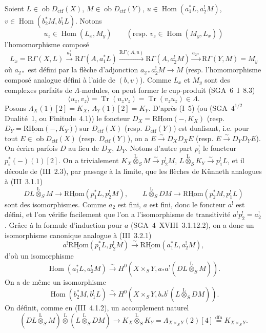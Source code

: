 \documentclass[11pt]{article}
\DeclareMathOperator{\Hom}{Hom}
\newcommand{\R}{\mathrm{R}}\newcommand{\RHomCore}{\mathrm{RHom}}
\newcommand{\ob}{\operatorname{ob}}
\providecommand{\RHom}{\RHomCore}
\providecommand{\uRHom}{\underline{\RHom}}
\providecommand{\ctf}{\mathrm{ctf}}
\providecommand{\Tr}{\operatorname{Tr}}
\providecommand{\Tr}{\operatorname{Tr}}
\providecommand{\lten}{\overset{\mathrm L}{\otimes}}
\providecommand{\Tr}{\operatorname{Tr}}
\providecommand{\RHom}{\RHomCore}
\providecommand{\Hom}{\operatorname{Hom}}
\providecommand{\ob}{\operatorname{ob}}
\providecommand{\lten}{\overset{\mathrm L}{\otimes}}
\providecommand{\RHom}{\R\mathcal{H}om}
\providecommand{\lten}{\overset{\mathrm L}{\otimes}}
\providecommand{\R}{\mathrm R}
\providecommand{\Tr}{\operatorname{Tr}}
\providecommand{\lten}{\overset{\mathrm L}{\otimes}}
\providecommand{\lten}{\overset{\mathrm L}{\otimes}}
\providecommand{\lten}{\overset{\mathrm L}{\otimes}}
\providecommand{\RHom}{\RHomCore}
\providecommand{\Hom}{\operatorname{Hom}}
\providecommand{\Tr}{\operatorname{Tr}}
\providecommand{\lten}{\overset{\mathrm L}{\otimes}}
\begin{document}
Soient $L\in \ob D_{\ctf}(X)$, $M\in \ob D_{\ctf}(Y)$, $u\in\Hom(a_1^*L,a_2^!M)$, $v\in\Hom(b_2^*M,b_1^!L)$. Notons
\[
u_z\in\Hom(L_x,M_y)\qquad (\text{resp. }v_z\in\Hom(M_y,L_x))
\]
l'homomorphisme composé
\[
L_x=\R\Gamma(X,L)\xrightarrow{a_1^*}\R\Gamma(A,a_1^*L)
\xrightarrow{\R\Gamma(A,u)}\R\Gamma(A,a_2^!M)
\xrightarrow{a_{2*}}\R\Gamma(Y,M)=M_y
\]
où $a_{2*}$ est défini par la flèche d'adjonction $a_{2*}a_2^!M\to M$ (resp. l'homomorphisme composé analogue défini à l'aide de $(b,v)$). Comme $L_x$ et $M_y$ sont des complexes parfaits de $\Lambda$-modules, on peut former le cup-produit (SGA~6~I~8.3)
\begin{equation}\tag{1.1.1}
\langle u_z,v_z\rangle=\Tr(u_zv_z)=\Tr(v_zu_z)\in\Lambda.
\end{equation}
Posons $\Lambda_X(1)[2]=K_X$, $\Lambda_Y(1)[2]=K_Y$. D'après (I~5) (ou (SGA~$4^{1/2}$ Dualité~1, ou Finitude~4.1)) le foncteur $D_X=\uRHom(-,K_X)$ (resp. $D_Y=\uRHom(-,K_Y)$) sur 
$D_{\ctf}(X)$ (resp. $D_{\ctf}(Y)$) est dualisant, i.e. pour tout $E\in\ob D_{\ctf}(X)$ (resp. $D_{\ctf}(Y)$), on a $E\xrightarrow{\sim}D_XD_XE$ (resp. $E\xrightarrow{\sim}D_YD_YE$). On écrira parfois $D$ au
lieu de $D_X$, $D_Y$. Notons d'autre part $p_i^!$ le foncteur $p_i^*(-)(1)[2]$. On a trivialement $K_X\lten_SM\xrightarrow{\sim}p_2^!M$, $L\lten_SK_Y\xrightarrow{\sim}p_1^!L$, et il découle de (III~2.3), par passage à la limite, que les flèches de Künneth analogues à (III~3.1.1)
\[
DL\lten_SM\longrightarrow \uRHom(p_1^*L,p_2^!M),
\qquad
L\lten_SDM\longrightarrow \uRHom(p_2^*M,p_1^!L)
\]
sont des isomorphismes. Comme $a_2$ est fini, $a$ est fini, donc le foncteur $a^!$ est défini, et l'on vérifie facilement que l'on a l'isomorphisme de transitivité $a^!p_2^!=a_2^!$. Grâce à la formule d'induction pour $a$ (SGA~4~XVIII~3.1.12.2), on a donc un isomorphisme canonique analogue à (III~3.2.1)
\[
a^!\uRHom(p_1^*L,p_2^!M)\xrightarrow{\sim}\uRHom(a_1^*L,a_2^!M),
\]
d'où un isomorphisme
\begin{equation}\tag{*}
\Hom(a_1^*L,a_2^!M)\xrightarrow{\sim}H^0(X\times_S Y,a_*a^!(DL\lten_SM)).
\end{equation}
On a de même un isomorphisme
\begin{equation}\tag{**}
\Hom(b_2^*M,b_1^!L)\xrightarrow{\sim}H^0(X\times_S Y,b_*b^!(L\lten_SDM)).
\end{equation}
On définit, comme en (III~4.1.2), un accouplement naturel
\[
(DL\lten_SM)\lten(L\lten_SDM)
\longrightarrow K_X\lten_SK_Y=\Lambda_{X\times_S Y}(2)[4]\stackrel{\mathrm{dfn}}{=}K_{X\times_S Y}.
\]
\end{document}
